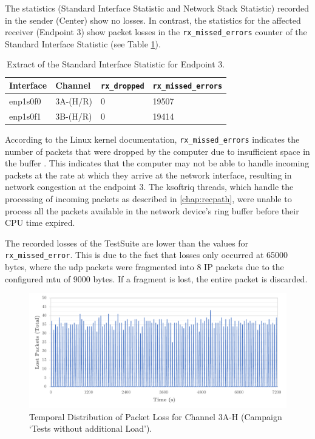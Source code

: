 The statistics (Standard Interface Statistic and Network Stack Statistic) recorded in the sender (Center) show no losses. In contrast, the statistics for the affected receiver (Endpoint 3) show packet losses in the \texttt{rx\_missed\_errors} counter of the Standard Interface Statistic (see Table \ref{tab:ep3InterfaceStat}).

\begin{table}[h]
\centering
\begin{tabular}{l|l|l|l}
	\toprule
	\textbf{Interface} & \textbf{Channel} & \textbf{\texttt{rx\_dropped}} & \textbf{\texttt{rx\_missed\_errors}} \\
	\midrule
 	enp1s0f0 & 3A-(H/R) & 0 & 19507 \\ 
 	enp1s0f1 & 3B-(H/R) & 0 & 19414 \\
	\bottomrule
\end{tabular}
\caption{Extract of the Standard Interface Statistic for Endpoint 3.}
\label{tab:ep3InterfaceStat}
\end{table}

According to the Linux kernel documentation, \texttt{rx\_missed\_errors} indicates the number of packets that were dropped by the computer due to insufficient space in the buffer \cite{sock11}. This indicates that the computer may not be able to handle incoming packets at the rate at which they arrive at the network interface, resulting in network congestion at the endpoint 3. The ksoftriq threads, which handle the processing of incoming packets as described in \ref{chap:recpath}, were unable to process all the packets available in the network device's ring buffer before their \ac{CPU} time expired.

The recorded losses of the TestSuite are lower than the values for \texttt{rx\_missed\_error}. This is due to the fact that losses only occurred at 65000 bytes, where the \ac{udp} packets were fragmented into 8 IP packets due to the configured \ac{mtu} of 9000 bytes. If a fragment is lost, the entire packet is discarded.

\begin{figure}[h!]
    \centering
    \includegraphics[width=1\linewidth]{figures/reliability/ihawk/diagr6.pdf}
    \caption{Temporal Distribution of Packet Loss for Channel 3A-H (Campaign `Tests without additional Load').}
    \label{fig:diagr6Temp}
\end{figure}

